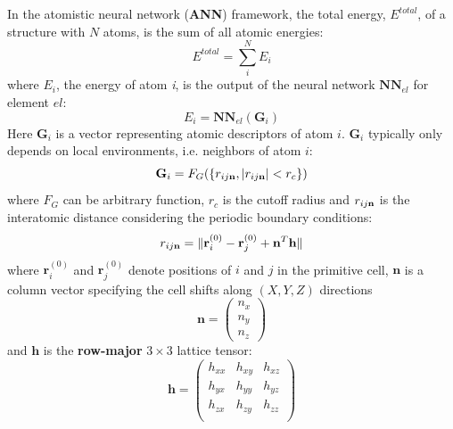 \documentclass[preprint]{revtex4-2}
\begin{document}
In the atomistic neural network (\textbf{ANN}) framework, the total energy, 
$E^{total}$, of a structure with $N$ atoms, is the sum of all atomic energies:
\begin{equation}
\label{eq:general_e_total}
E^{total} = \sum_{i}^{N}{E_i}
\end{equation}
where $E_{i}$, the energy of atom \textit{i}, is the output of the neural 
network $\mathbf{NN}_{el}$ for element $el$:
\begin{equation}
E_i = \mathbf{NN}_{el}\left( \mathbf{G}_i \right)
\end{equation} 
Here $\mathbf{G}_i$ is a vector representing atomic descriptors of atom $i$. 
$\mathbf{G}_i$ typically only depends on local environments, i.e.  
neighbors of atom $i$:
\begin{equation}
\mathbf{G}_i = F_G(\left\{ r_{ij\mathbf{n}}, |r_{ij\mathbf{n}}| < r_c\right\} )
\end{equation}
where $F_G$ can be arbitrary function, $r_c$ is the cutoff radius and $r_{ij\mathbf{n}}$ is 
the interatomic distance considering the periodic boundary conditions: 
\begin{equation}
    \label{eq:rijn}
    r_{ij\mathbf{n}} = \Vert \mathbf{r}_i^{(0)} - \mathbf{r}_j^{(0)} + 
    \mathbf{n}^T \mathbf{h} \Vert
\end{equation}
where $\mathbf{r}_i^{(0)}$ and $\mathbf{r}_j^{(0)}$ denote positions of $i$ and 
$j$ in the primitive cell, $\mathbf{n}$ is a column vector specifying the cell 
shifts along $(X,Y,Z)$ directions 
\begin{equation}
    \label{eq:ij_shift}
    \mathbf{n} = \begin{pmatrix}
        n_x \\
        n_y \\
        n_z
    \end{pmatrix}
\end{equation}
and $\mathbf{h}$ is the \textbf{row-major} $3 \times 3$ lattice tensor:
\begin{equation}
    \label{eq:lattice}
    \mathbf{h} = \begin{pmatrix}
        h_{xx} & h_{xy} & h_{xz} \\
        h_{yx} & h_{yy} & h_{yz} \\
        h_{zx} & h_{zy} & h_{zz} \\
    \end{pmatrix}
\end{equation}
\end{document}
